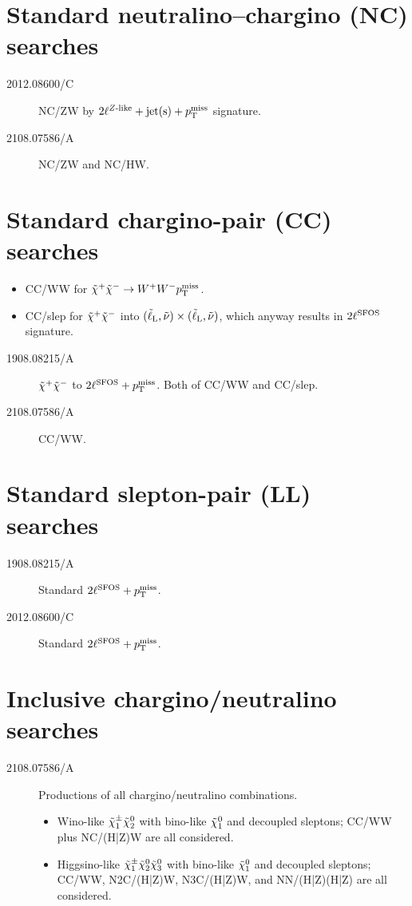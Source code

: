 \section[Standard NC searches]{Standard neutralino--chargino (NC) searches}

\begin{description}
\item[2012.08600/C] NC/ZW by $2\ell\wZlike+\text{jet(s)}+\mpT$ signature.
\item[2108.07586/A] NC/ZW and NC/HW.
\end{description}


\section[Standard CC searches]{Standard chargino-pair (CC) searches}
\begin{itemize}
 \item CC/WW for $\charP\charM\to W^+W^-\mpT$.
 \item CC/slep for $\charP\charM$ into $(\slepL,\snu)\times(\slepL,\snu)$, which anyway results in $2\ell\wSFOS$ signature.
\end{itemize}


\begin{description}
\item[1908.08215/A] $\charP\charM$ to $2\ell\wSFOS+\mpT$. Both of CC/WW and CC/slep.
\item[2108.07586/A] CC/WW.
\end{description}



\section[Standard LL searches]{Standard slepton-pair (LL) searches}
\begin{description}
\item[1908.08215/A] Standard $2\ell\wSFOS+\mpT$.
\item[2012.08600/C] Standard $2\ell\wSFOS+\mpT$.
\end{description}


\section[Inclusive ino searches]{Inclusive chargino/neutralino searches}
\begin{description}
\item[2108.07586/A] Productions of all chargino/neutralino combinations.
\begin{itemize}
 \item Wino-like $\charPM[1]\neut[2]$ with bino-like $\neut[1]$ and decoupled sleptons; CC/WW plus NC/(H|Z)W are all considered.
 \item Higgsino-like $\charPM[1]\neut[2]\neut[3]$ with bino-like $\neut[1]$ and decoupled sleptons; CC/WW, N2C/(H|Z)W, N3C/(H|Z)W, and NN/(H|Z)(H|Z) are all considered.
\end{itemize}
\end{description}


